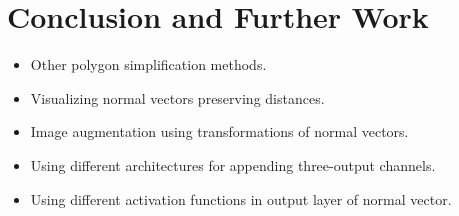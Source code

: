 \chapter*{Conclusion and Further Work}

\begin{itemize}
  \item Other polygon simplification methods.
  \item Visualizing normal vectors preserving distances.
  \item Image augmentation using transformations of normal vectors.
  \item Using different architectures for appending three-output channels.
  \item Using different activation functions in output layer of normal vector.
\end{itemize}
